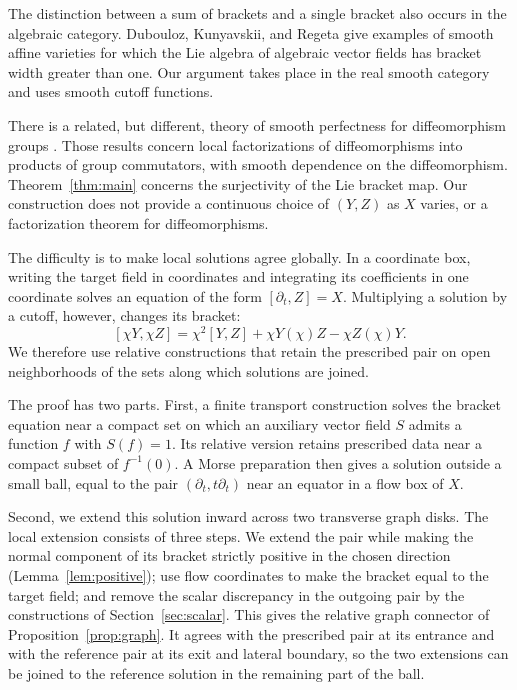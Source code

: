 \documentclass[11pt]{article}
\theoremstyle{remark}
\begin{document}
The distinction between a sum of brackets and a single bracket also occurs in the algebraic category. Dubouloz, Kunyavskii, and Regeta \cite{DuboulozKunyavskiiRegeta2021} give examples of smooth affine varieties for which the Lie algebra of algebraic vector fields has bracket width greater than one. Our argument takes place in the real smooth category and uses smooth cutoff functions.

There is a related, but different, theory of smooth perfectness for diffeomorphism groups \cite{HallerRybickiTeichmann2013,HallerTeichmann2003}. Those results concern local factorizations of diffeomorphisms into products of group commutators, with smooth dependence on the diffeomorphism. Theorem~\ref{thm:main} concerns the surjectivity of the Lie bracket map. Our construction does not provide a continuous choice of $(Y, Z)$ as $X$ varies, or a factorization theorem for diffeomorphisms.

The difficulty is to make local solutions agree globally. In a coordinate box, writing the target field in coordinates and integrating its coefficients in one coordinate solves an equation of the form $[\partial_t,Z]=X$. Multiplying a solution by a cutoff, however, changes its bracket:
$$
    [\chi Y,\chi Z]
    =
    \chi^2[Y,Z]
    +\chi Y(\chi)Z
    -\chi Z(\chi)Y.
$$
We therefore use relative constructions that retain the prescribed pair on open neighborhoods of the sets along which solutions are joined.

The proof has two parts. First, a finite transport construction solves the bracket equation near a compact set on which an auxiliary vector field $S$ admits a function $f$ with $S(f)=1$. Its relative version retains prescribed data near a compact subset of $f^{-1}(0)$. A Morse preparation then gives a solution outside a small ball, equal to the pair $(\partial_t,t\partial_t)$ near an equator in a flow box of $X$.

Second, we extend this solution inward across two transverse graph disks. The local extension consists of three steps. We extend the pair while making the normal component of its bracket strictly positive in the chosen direction (Lemma~\ref{lem:positive}); use flow coordinates to make the bracket equal to the target field; and remove the scalar discrepancy in the outgoing pair by the constructions of Section~\ref{sec:scalar}. This gives the relative graph connector of Proposition~\ref{prop:graph}. It agrees with the prescribed pair at its entrance and with the reference pair at its exit and lateral boundary, so the two extensions can be joined to the reference solution in the remaining part of the ball.
\end{document}
